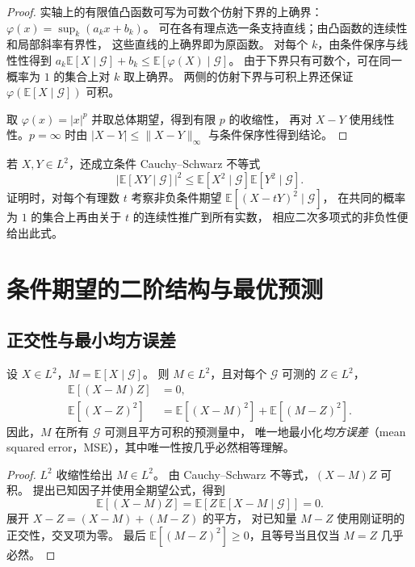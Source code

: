 \documentclass[UTF8,12pt,a4paper,fontset=fandol]{ctexart}
\begin{document}
\begin{proof}
实轴上的有限值凸函数可写为可数个仿射下界的上确界：
$\varphi(x)=\sup_k(a_kx+b_k)$。
可在各有理点选一条支持直线；由凸函数的连续性和局部斜率有界性，
这些直线的上确界即为原函数。
对每个 $k$，由条件保序与线性性得到
$a_k\mathbb E[X\mid\mathcal G]+b_k
\leq\mathbb E[\varphi(X)\mid\mathcal G]$。
由于下界只有可数个，可在同一概率为 $1$ 的集合上对 $k$ 取上确界。
两侧的仿射下界与可积上界还保证 $\varphi(\mathbb E[X\mid\mathcal G])$ 可积。

取 $\varphi(x)=|x|^p$ 并取总体期望，得到有限 $p$ 的收缩性，
再对 $X-Y$ 使用线性性。$p=\infty$ 时由
$|X-Y|\leq\|X-Y\|_\infty$ 与条件保序性得到结论。
\end{proof}

若 $X,Y\in L^2$，还成立条件 Cauchy--Schwarz 不等式
\[
  |\mathbb E[XY\mid\mathcal G]|^2
  \leq\mathbb E[X^2\mid\mathcal G]\mathbb E[Y^2\mid\mathcal G].
\]
证明时，对每个有理数 $t$ 考察非负条件期望
$\mathbb E[(X-tY)^2\mid\mathcal G]$，
在共同的概率为 $1$ 的集合上再由关于 $t$ 的连续性推广到所有实数，
相应二次多项式的非负性便给出此式。

\section{条件期望的二阶结构与最优预测}
\label{sec:conditional-projection}

\subsection{正交性与最小均方误差}

\begin{theorem}[条件期望的正交投影性质]
\label{thm:conditional-projection}
设 $X\in L^2$，$M=\mathbb E[X\mid\mathcal G]$。
则 $M\in L^2$，且对每个 $\mathcal G$ 可测的 $Z\in L^2$，
\begin{align}
  \mathbb E[(X-M)Z]&=0,
    \label{eq:conditional-orthogonality}\\
  \mathbb E[(X-Z)^2]
    &=\mathbb E[(X-M)^2]+\mathbb E[(M-Z)^2].
    \label{eq:conditional-pythagoras}
\end{align}
因此，$M$ 在所有 $\mathcal G$ 可测且平方可积的预测量中，
唯一地最小化\emph{均方误差}（mean squared error，MSE），其中唯一性按几乎必然相等理解。
\end{theorem}

\begin{proof}
$L^2$ 收缩性给出 $M\in L^2$。
由 Cauchy--Schwarz 不等式，$(X-M)Z$ 可积。
提出已知因子并使用全期望公式，得到
\[
  \mathbb E[(X-M)Z]
  =\mathbb E[Z\,\mathbb E[X-M\mid\mathcal G]]=0.
\]
展开 $X-Z=(X-M)+(M-Z)$ 的平方，
对已知量 $M-Z$ 使用刚证明的正交性，交叉项为零。
最后 $\mathbb E[(M-Z)^2]\geq0$，且等号当且仅当 $M=Z$ 几乎必然。
\end{proof}
\end{document}
